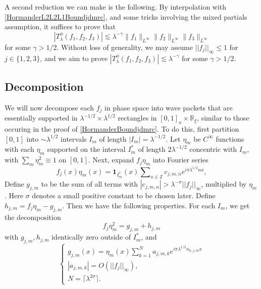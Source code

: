 \documentclass[12pt]{amsart}
\newcommand*{\Z}{\mathbb{Z}}
\newcommand*{\R}{\mathbb{R}}
\begin{document}
A second reduction we can make is the following. By interpolation with \eqref{HormanderL2L2L1Boundjdmrc}, and some tricks involving the mixed partials assumption, it suffices to prove that
%
\begin{equation}
    |T^\phi_\lambda(f_1,f_2,f_3)| \lesssim \lambda^{-\gamma} \| f_1 \|_{L^\infty} \| f_2 \|_{L^\infty} \| f_3 \|_{L^\infty}
\end{equation}
%
for some $\gamma > 1/2$. Without loss of generality, we may assume $||f_j||_\infty\leq 1$ for $j \in \{1,2,3 \}$, and we aim to prove $|T_\lambda^\phi(f_1,f_2,f_3)|\lesssim \lambda^{-\gamma}$ for some $\gamma>1/2$.

\subsection{Decomposition} \label{Decompositionjdmrc} We will now decompose each $f_j$ in phase space into wave packets that are essentially supported in $\lambda^{-1/2} \times \lambda^{1/2}$ rectangles in $[0,1]_x\times \R_\xi$, similar to those occuring in the proof of \eqref{HormanderBoundjdmrc}. To do this, first partition $[0,1]$ into $\sim \lambda^{1/2}$ intervals $I_m$ of length $|I_m|=\lambda^{-1/2}$. Let $\eta_m$ be $C^\infty$ functions with each $\eta_m$ supported on the interval $I_m^*$ of length $2\lambda^{-1/2}$ concentric with $I_m$, with $\sum_m \eta_m^2\equiv 1$ on $[0,1]$. Next, expand $f_j\eta_m$ into Fourier series
\begin{equation}\label{decomp1jdmrc}
    f_j(x)\eta_m(x)=\boldsymbol{1}_{I_m^*}(x)\sum\nolimits_{n\in \Z} c_{j,m,n} e^{i\pi\lambda^{1/2}nx},
\end{equation}
Define $g_{j,m}$ to be the sum of all terms with $|c_{j,m,n}|>\lambda^{-\sigma}||f_j||_\infty$, multiplied by $\eta_m$. Here $\sigma$ denotes a small positive constant to be chosen later. Define $h_{j,m}=f_j\eta_m-g_{j,m}$. Then we have the following properties. For each $I_m$, we get the decomposition
\begin{equation}
    f_j\eta_m^2=g_{j,m}+h_{j,m}
\end{equation}
with $g_{j,m},h_{j,m}$ identically zero outside of $I_m^*$, and
\begin{equation}
    \begin{cases}
    g_{j,m}(x)=\eta_m(x)\sum_{k=1}^N a_{j,m,k}e^{i\pi \lambda^{1/2}n_{k,j,m} x}\\
    |a_{j,m,k}|=O(||f_j||_\infty),\\
    N=\lceil\lambda^{2\sigma}\rceil.
\end{cases}
\end{equation}
\end{document}
